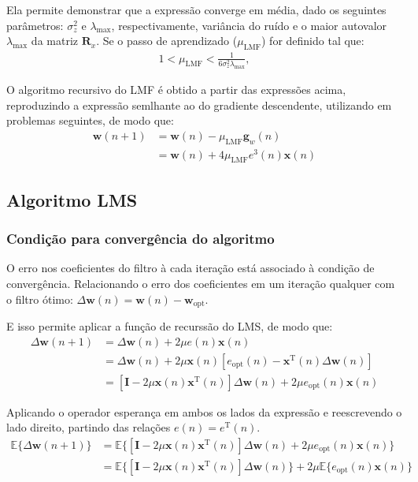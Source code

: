 Ela permite demonstrar que a expressão converge em média, dado os seguintes parâmetros: $\sigma^{2}_{z}$ e $\lambda_{\text{max}}$, respectivamente, variância do ruído e o maior autovalor $\lambda_{\max}$ da matriz $\mathbf{R}_{x}$. Se o passo de aprendizado ($\mu_{\text{LMF}}$) for definido tal que:
\begin{align*}
    1 < \mu_{\text{LMF}} < \frac{1}{6 \sigma^{2}_{z} \lambda_{\text{max}}},
\end{align*}

O algoritmo recursivo do LMF é obtido a partir das expressões acima, reproduzindo a expressão semlhante ao do gradiente descendente, utilizando em problemas seguintes, de modo que:
\begin{align*}
    \mathbf{w}(n + 1) &= \mathbf{w}(n) - \mu_{\text{LMF}}\mathbf{g}_{w}(n) \\
    &= \mathbf{w}(n) + 4 \mu_{\text{LMF}} e^{3}(n) \mathbf{x}(n)
\end{align*}
\clearpage


\subsection{Algoritmo LMS} %

\subsubsection*{Condição para convergência do algoritmo}

O erro nos coeficientes do filtro à cada iteração está associado à condição de convergência. Relacionando o erro dos coeficientes em um iteração qualquer com o filtro ótimo: $ \Delta \mathbf{w}(n) = \mathbf{w}(n) - \mathbf{w}_{\text{opt}} $. 

E isso permite aplicar a função de recurssão do LMS, de modo que:
\begin{align*}
    \Delta \mathbf{w}(n + 1) &= \Delta \mathbf{w}(n) + 2 \mu e(n) \mathbf{x}(n) \\
    &= \Delta \mathbf{w}(n) + 2 \mu \mathbf{x}(n) \left[e_{\text{opt}}(n) - \mathbf{x}^{\text{T}}(n) \Delta \mathbf{w}(n)\right] \\
    &= \left[ \mathbf{I} - 2 \mu \mathbf{x}(n) \mathbf{x}^{\text{T}}(n) \right] \Delta \mathbf{w}(n) + 2 \mu e_{\text{opt}}(n) \mathbf{x}(n)
\end{align*}

Aplicando o operador esperança em ambos os lados da expressão e reescrevendo o lado direito, partindo das relações $e(n) = e^{\text{T}}(n)$.
\begin{align*}
    \mathbb{E}\{\Delta \mathbf{w}(n + 1)\} &= \mathbb{E}\{\left[ \mathbf{I} - 2 \mu \mathbf{x}(n) \mathbf{x}^{\text{T}}(n) \right] \Delta \mathbf{w}(n) + 2 \mu e_{\text{opt}}(n) \mathbf{x}(n)\} \\
    &= \mathbb{E}\{\left[ \mathbf{I} - 2 \mu \mathbf{x}(n) \mathbf{x}^{\text{T}}(n) \right] \Delta \mathbf{w}(n)\} + 2 \mu \mathbb{E}\{e_{\text{opt}}(n) \mathbf{x}(n)\}
\end{align*}

